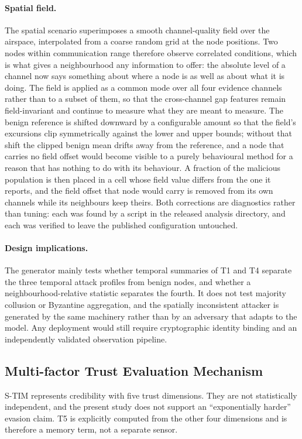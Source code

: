 \documentclass[notspecified,article,submit,moreauthors]{Definitions/mdpi}
\begin{document}
\paragraph{Spatial field.}
The spatial scenario superimposes a smooth channel-quality field over the airspace, interpolated from a coarse random grid at the node positions. Two nodes within communication range therefore observe correlated conditions, which is what gives a neighbourhood any information to offer: the absolute level of a channel now says something about where a node is as well as about what it is doing. The field is applied as a common mode over all four evidence channels rather than to a subset of them, so that the cross-channel gap features remain field-invariant and continue to measure what they are meant to measure. The benign reference is shifted downward by a configurable amount so that the field's excursions clip symmetrically against the lower and upper bounds; without that shift the clipped benign mean drifts away from the reference, and a node that carries no field offset would become visible to a purely behavioural method for a reason that has nothing to do with its behaviour. A fraction of the malicious population is then placed in a cell whose field value differs from the one it reports, and the field offset that node would carry is removed from its own channels while its neighbours keep theirs. Both corrections are diagnostics rather than tuning: each was found by a script in the released analysis directory, and each was verified to leave the published configuration untouched.

\paragraph{Design implications.}
The generator mainly tests whether temporal summaries of T1 and T4 separate the three temporal attack profiles from benign nodes, and whether a neighbourhood-relative statistic separates the fourth. It does not test majority collusion or Byzantine aggregation, and the spatially inconsistent attacker is generated by the same machinery rather than by an adversary that adapts to the model. Any deployment would still require cryptographic identity binding and an independently validated observation pipeline.

\subsection{Multi-factor Trust Evaluation Mechanism}
\label{sec:trust_eval}
S-TIM represents credibility with five trust dimensions. They are not statistically independent, and the present study does not support an ``exponentially harder'' evasion claim. T5 is explicitly computed from the other four dimensions and is therefore a memory term, not a separate sensor.
\end{document}
